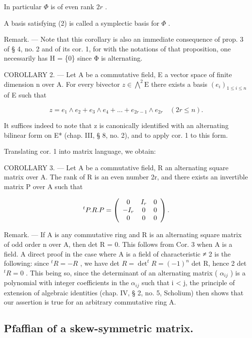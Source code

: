 In particular \(\Phi\) is of even rank \(2r\) .

A basis satisfying (2) is called a symplectic basis for \(\Phi\) .

Remark. --- Note that this corollary is also an immediate consequence of prop. 3 of § 4, no. 2 and of its cor. 1, for with the notations of that proposition, one necessarily has H = \{0\} since Φ is alternating.

COROLLARY 2. --- Let A be a commutative field, E a vector space of finite dimension n over A. For every bivector \(z \in \bigwedge^{2} \mathrm{E}\) there exists a basis \((e_i)_{1 \leqslant i \leqslant n}\) of E such that

\[
z = e _ {1} \wedge e _ {2} + e _ {3} \wedge e _ {4} + \dots + e _ {2 r - 1} \wedge e _ {2 r} \quad (2 r \leqslant n).
\]

It suffices indeed to note that z is canonically identified with an alternating bilinear form on E* (chap. III, § 8, no. 2), and to apply cor. 1 to this form.

Translating cor. 1 into matrix language, we obtain:

COROLLARY 3. --- Let A be a commutative field, R an alternating square matrix over A. The rank of R is an even number 2r, and there exists an invertible matrix P over A such that

\[
{ } ^ { t } P . R . P = \left( \begin{array} { c c c } 0 & I _ { r } & 0 \\ - I _ { r } & 0 & 0 \\ 0 & 0 & 0 \end{array} \right) .
\]

Remark. --- If A is any commutative ring and R is an alternating square matrix of odd order n over A, then det R = 0. This follows from Cor. 3 when A is a field. A direct proof in the case where A is a field of characteristic ≠ 2 is the following: since \(^tR = -R\) , we have det \(R = \det ^t R = (-1)^n\) det R, hence 2 det \(^tR = 0\) . This being so, since the determinant of an alternating matrix ( \(\alpha_{ij}\) ) is a polynomial with integer coefficients in the \(\alpha_{ij}\) such that i \textless{} j, the principle of extension of algebraic identities (chap. IV, § 2, no. 5, Scholium) then shows that our assertion is true for an arbitrary commutative ring A.

\subsection{Pfaffian of a skew-symmetric matrix.}

